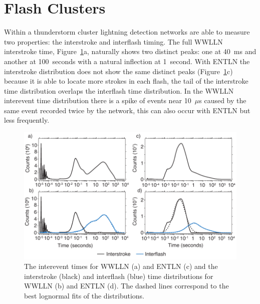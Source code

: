 \section{Flash Clusters}
\label{thunderstorm:sec:interflash}

Within a thunderstorm cluster lightning detection networks are able to measure two properties: the interstroke and interflash timing.
The full WWLLN interstroke time, Figure~\ref{thunderstorm:fig:interflash}a, naturally shows two distinct peaks: one at 40~ms and another at 100~seconds with a natural inflection at 1~second.
With ENTLN the interstroke distribution does not show the same distinct peaks (Figure~\ref{thunderstorm:fig:interflash}c) because it is able to locate more strokes in each flash, the tail of the interstroke time distribution overlaps the interflash time distribution.
In the WWLLN interevent time distribution there is a spike of events near 10~$\mu$s caused by the same event recorded twice by the network, this can also occur with ENTLN but less frequently.

\begin{figure}[ht!]
   \centering
   \includegraphics[scale=1]{thunderstorm/Figures/interflash.pdf}
   \caption{The interevent times for WWLLN (a) and ENTLN (c) and the interstroke (black) and interflash (blue) time distributions for WWLLN (b) and ENTLN (d).
           The dashed lines correspond to the best lognormal fits of the distributions.}
   \label{thunderstorm:fig:interflash}
\end{figure}

